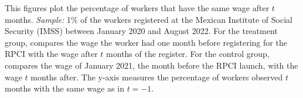\documentclass[oneside,11pt]{article}
\begin{document}
\scriptsize{
\noindent This figures plot the percentage of workers that have the same wage after $t$ months. \textit{Sample:} 1\% of the workers registered at the Mexican Institute of Social Security (IMSS) between January 2020 and August 2022. For the treatment group, compares the wage the worker had one month before registering for the RPCI with the wage after $t$ months of the register. For the control group, compares the wage of January 2021, the month before the RPCI launch, with the wage $t$ months after. The y-axis measures the percentage of workers observed $t$ months with the same wage as in $t = -1$.
}


\clearpage
\end{document}
